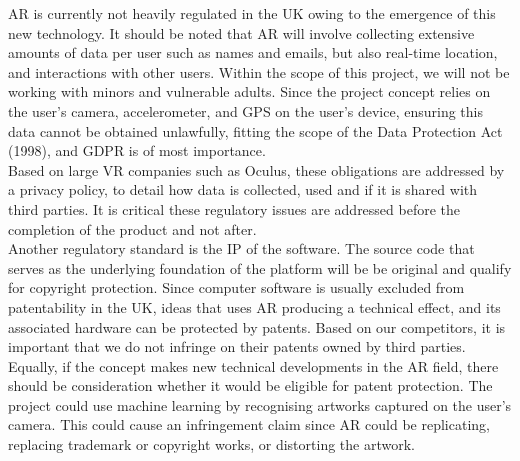 
AR is currently not heavily regulated in the UK owing to the emergence of this new technology. It should be noted that AR will involve collecting extensive amounts of data per user such as names and emails, but also real-time location, and interactions with other users. Within the scope of this project, we will not be working with minors and vulnerable adults. Since the project concept relies on the user's camera, accelerometer, and GPS on the user's device, ensuring this data cannot be obtained unlawfully, fitting the scope of the Data Protection Act (1998), and GDPR is of most importance.\cite{ITProPortal}\\

Based on large VR companies such as Oculus, these obligations are addressed by a privacy policy, to detail how data is collected, used and if it is shared with third parties. It is critical these regulatory issues are addressed before the completion of the product and not after.\\

Another regulatory standard is the IP of the software. The source code that serves as the underlying foundation of the platform will be be original and qualify for copyright protection. Since computer software is usually excluded from patentability in the UK, ideas that uses AR producing a technical effect, and its associated hardware can be protected by patents. Based on our competitors, it is important that we do not infringe on their patents owned by third parties.\\

Equally, if the concept makes new technical developments in the AR field, there should be consideration whether it would be eligible for patent protection. The project could use machine learning by recognising artworks captured on the user's camera. This could cause an infringement claim since AR could be replicating, replacing trademark or copyright works, or distorting the artwork.